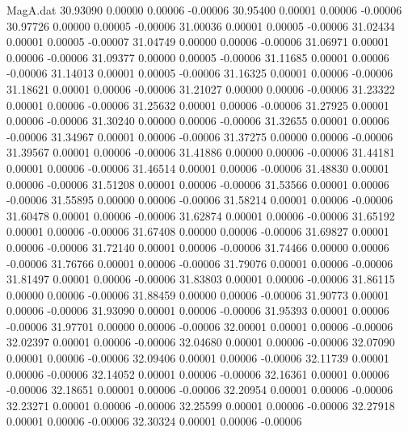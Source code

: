 \begin{filecontents}{MagA.dat}
  30.93090    0.00000    0.00006   -0.00006
  30.95400    0.00001    0.00006   -0.00006
  30.97726    0.00000    0.00005   -0.00006
  31.00036    0.00001    0.00005   -0.00006
  31.02434    0.00001    0.00005   -0.00007
  31.04749    0.00000    0.00006   -0.00006
  31.06971    0.00001    0.00006   -0.00006
  31.09377    0.00000    0.00005   -0.00006
  31.11685    0.00001    0.00006   -0.00006
  31.14013    0.00001    0.00005   -0.00006
  31.16325    0.00001    0.00006   -0.00006
  31.18621    0.00001    0.00006   -0.00006
  31.21027    0.00000    0.00006   -0.00006
  31.23322    0.00001    0.00006   -0.00006
  31.25632    0.00001    0.00006   -0.00006
  31.27925    0.00001    0.00006   -0.00006
  31.30240    0.00000    0.00006   -0.00006
  31.32655    0.00001    0.00006   -0.00006
  31.34967    0.00001    0.00006   -0.00006
  31.37275    0.00000    0.00006   -0.00006
  31.39567    0.00001    0.00006   -0.00006
  31.41886    0.00000    0.00006   -0.00006
  31.44181    0.00001    0.00006   -0.00006
  31.46514    0.00001    0.00006   -0.00006
  31.48830    0.00001    0.00006   -0.00006
  31.51208    0.00001    0.00006   -0.00006
  31.53566    0.00001    0.00006   -0.00006
  31.55895    0.00000    0.00006   -0.00006
  31.58214    0.00001    0.00006   -0.00006
  31.60478    0.00001    0.00006   -0.00006
  31.62874    0.00001    0.00006   -0.00006
  31.65192    0.00001    0.00006   -0.00006
  31.67408    0.00000    0.00006   -0.00006
  31.69827    0.00001    0.00006   -0.00006
  31.72140    0.00001    0.00006   -0.00006
  31.74466    0.00000    0.00006   -0.00006
  31.76766    0.00001    0.00006   -0.00006
  31.79076    0.00001    0.00006   -0.00006
  31.81497    0.00001    0.00006   -0.00006
  31.83803    0.00001    0.00006   -0.00006
  31.86115    0.00000    0.00006   -0.00006
  31.88459    0.00000    0.00006   -0.00006
  31.90773    0.00001    0.00006   -0.00006
  31.93090    0.00001    0.00006   -0.00006
  31.95393    0.00001    0.00006   -0.00006
  31.97701    0.00000    0.00006   -0.00006
  32.00001    0.00001    0.00006   -0.00006
  32.02397    0.00001    0.00006   -0.00006
  32.04680    0.00001    0.00006   -0.00006
  32.07090    0.00001    0.00006   -0.00006
  32.09406    0.00001    0.00006   -0.00006
  32.11739    0.00001    0.00006   -0.00006
  32.14052    0.00001    0.00006   -0.00006
  32.16361    0.00001    0.00006   -0.00006
  32.18651    0.00001    0.00006   -0.00006
  32.20954    0.00001    0.00006   -0.00006
  32.23271    0.00001    0.00006   -0.00006
  32.25599    0.00001    0.00006   -0.00006
  32.27918    0.00001    0.00006   -0.00006
  32.30324    0.00001    0.00006   -0.00006

\end{filecontents}
